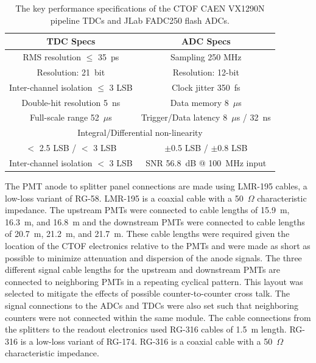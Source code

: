 \documentclass{elsart}
\begin{document}
\begin{table}[htbp]
\begin{center}
\begin{tabular}{c|c} \hline
TDC Specs                           & ADC Specs \\ \hline
RMS resolution $\le$ 35~ps          & Sampling 250 MHz \\ \hline 
Resolution: 21~bit                  & Resolution: 12-bit \\ \hline
Inter-channel isolation $\le$ 3 LSB & Clock jitter 350~fs \\ \hline
Double-hit resolution 5~ns          & Data memory 8~$\mu$s \\ \hline    
Full-scale range 52~$\mu$s          & Trigger/Data latency 8~$\mu$s / 32~ns \\ \hline  
\multicolumn{2}{c}{Integral/Differential non-linearity} \\
$<$ 2.5 LSB / $<$ 3 LSB             & $\pm$0.5 LSB / $\pm$0.8 LSB \\ \hline
Inter-channel isolation $<$ 3 LSB   & SNR 56.8~dB @ 100~MHz input \\ \hline
\end{tabular}
\end{center}
\caption{The key performance specifications of the CTOF CAEN VX1290N pipeline TDCs and JLab 
FADC250 flash ADCs.}
\label{tdcadc-specs}
\end{table}

The PMT anode to splitter panel connections are made using LMR-195 cables, a low-loss variant 
of RG-58. LMR-195 is a coaxial cable with a 50~$\Omega$ characteristic impedance. The
upstream PMTs were connected to cable lengths of 15.9~m, 16.3~m, and 16.8~m and the 
downstream PMTs were connected to cable lengths of 20.7~m, 21.2~m, and 21.7~m. These cable 
lengths were required given the location of the CTOF electronics relative to the PMTs and were
made as short as possible to minimize attenuation and dispersion of the anode signals. The three
different signal cable lengths for the upstream and downstream PMTs are connected to neighboring
PMTs in a repeating cyclical pattern. This layout was selected to mitigate the effects of possible
counter-to-counter cross talk. The signal connections to the ADCs and TDCs were also set such that
neighboring counters were not connected within the same module. The cable connections from the
splitters to the readout electronics used RG-316 cables of 1.5~m length. RG-316 is a low-loss variant
of RG-174. RG-316 is a coaxial cable with a 50~$\Omega$ characteristic impedance.
\end{document}
